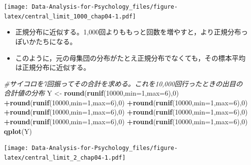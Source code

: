 \documentclass[]{article}
\newenvironment{Shaded}{\begin{snugshade}}{\end{snugshade}}
\newcommand{\KeywordTok}[1]{\textcolor[rgb]{0.13,0.29,0.53}{\textbf{#1}}}
\newcommand{\DataTypeTok}[1]{\textcolor[rgb]{0.13,0.29,0.53}{#1}}
\newcommand{\DecValTok}[1]{\textcolor[rgb]{0.00,0.00,0.81}{#1}}
\newcommand{\StringTok}[1]{\textcolor[rgb]{0.31,0.60,0.02}{#1}}
\newcommand{\CommentTok}[1]{\textcolor[rgb]{0.56,0.35,0.01}{\textit{#1}}}
\newcommand{\OperatorTok}[1]{\textcolor[rgb]{0.81,0.36,0.00}{\textbf{#1}}}
\newcommand{\NormalTok}[1]{#1}
\begin{document}
\texttt{[image: Data-Analysis-for-Psychology\_files/figure-latex/central\_limit\_1000\_chap04-1.pdf]}

\begin{itemize}
\item
  正規分布に近似する。1,000回よりももっと回数を増やすと，より正規分布っぽいかたちになる。
\item
  このように，元の母集団の分布がたとえ正規分布でなくても，その標本平均は正規分布に近似する。
\end{itemize}

\begin{Shaded}
\begin{Highlighting}[]
\CommentTok{#サイコロを7回振ってその合計を求める。これを10,000回行ったときの出目の合計値の分布}
\NormalTok{Y <-}\StringTok{ }\KeywordTok{round}\NormalTok{(}\KeywordTok{runif}\NormalTok{(}\DecValTok{10000}\NormalTok{,}\DataTypeTok{min=}\DecValTok{1}\NormalTok{,}\DataTypeTok{max=}\DecValTok{6}\NormalTok{),}\DecValTok{0}\NormalTok{) }\OperatorTok{+}\KeywordTok{round}\NormalTok{(}\KeywordTok{runif}\NormalTok{(}\DecValTok{10000}\NormalTok{,}\DataTypeTok{min=}\DecValTok{1}\NormalTok{,}\DataTypeTok{max=}\DecValTok{6}\NormalTok{),}\DecValTok{0}\NormalTok{) }\OperatorTok{+}\KeywordTok{round}\NormalTok{(}\KeywordTok{runif}\NormalTok{(}\DecValTok{10000}\NormalTok{,}\DataTypeTok{min=}\DecValTok{1}\NormalTok{,}\DataTypeTok{max=}\DecValTok{6}\NormalTok{),}\DecValTok{0}\NormalTok{) }\OperatorTok{+}\KeywordTok{round}\NormalTok{(}\KeywordTok{runif}\NormalTok{(}\DecValTok{10000}\NormalTok{,}\DataTypeTok{min=}\DecValTok{1}\NormalTok{,}\DataTypeTok{max=}\DecValTok{6}\NormalTok{),}\DecValTok{0}\NormalTok{) }\OperatorTok{+}\KeywordTok{round}\NormalTok{(}\KeywordTok{runif}\NormalTok{(}\DecValTok{10000}\NormalTok{,}\DataTypeTok{min=}\DecValTok{1}\NormalTok{,}\DataTypeTok{max=}\DecValTok{6}\NormalTok{),}\DecValTok{0}\NormalTok{) }\OperatorTok{+}\KeywordTok{round}\NormalTok{(}\KeywordTok{runif}\NormalTok{(}\DecValTok{10000}\NormalTok{,}\DataTypeTok{min=}\DecValTok{1}\NormalTok{,}\DataTypeTok{max=}\DecValTok{6}\NormalTok{),}\DecValTok{0}\NormalTok{) }\OperatorTok{+}\KeywordTok{round}\NormalTok{(}\KeywordTok{runif}\NormalTok{(}\DecValTok{10000}\NormalTok{,}\DataTypeTok{min=}\DecValTok{1}\NormalTok{,}\DataTypeTok{max=}\DecValTok{6}\NormalTok{),}\DecValTok{0}\NormalTok{)}
\KeywordTok{qplot}\NormalTok{(Y)}
\end{Highlighting}
\end{Shaded}

\texttt{[image: Data-Analysis-for-Psychology\_files/figure-latex/central\_limit\_2\_chap04-1.pdf]}
\end{document}

